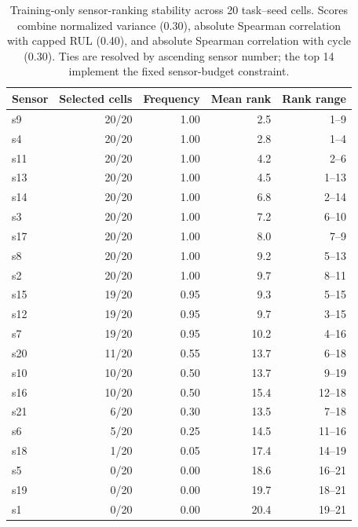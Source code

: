 \begin{table}[!t]
\centering
\scriptsize
\caption{Training-only sensor-ranking stability across 20 task--seed cells. Scores combine normalized variance (0.30), absolute Spearman correlation with capped RUL (0.40), and absolute Spearman correlation with cycle (0.30). Ties are resolved by ascending sensor number; the top 14 implement the fixed sensor-budget constraint.}
\label{tab:feature-selection-stability}
\begin{tabular}{lrrrr}
\toprule
Sensor & Selected cells & Frequency & Mean rank & Rank range \\
\midrule
s9 & 20/20 & 1.00 & 2.5 & 1--9 \\
s4 & 20/20 & 1.00 & 2.8 & 1--4 \\
s11 & 20/20 & 1.00 & 4.2 & 2--6 \\
s13 & 20/20 & 1.00 & 4.5 & 1--13 \\
s14 & 20/20 & 1.00 & 6.8 & 2--14 \\
s3 & 20/20 & 1.00 & 7.2 & 6--10 \\
s17 & 20/20 & 1.00 & 8.0 & 7--9 \\
s8 & 20/20 & 1.00 & 9.2 & 5--13 \\
s2 & 20/20 & 1.00 & 9.7 & 8--11 \\
s15 & 19/20 & 0.95 & 9.3 & 5--15 \\
s12 & 19/20 & 0.95 & 9.7 & 3--15 \\
s7 & 19/20 & 0.95 & 10.2 & 4--16 \\
s20 & 11/20 & 0.55 & 13.7 & 6--18 \\
s10 & 10/20 & 0.50 & 13.7 & 9--19 \\
s16 & 10/20 & 0.50 & 15.4 & 12--18 \\
s21 & 6/20 & 0.30 & 13.5 & 7--18 \\
s6 & 5/20 & 0.25 & 14.5 & 11--16 \\
s18 & 1/20 & 0.05 & 17.4 & 14--19 \\
s5 & 0/20 & 0.00 & 18.6 & 16--21 \\
s19 & 0/20 & 0.00 & 19.7 & 18--21 \\
s1 & 0/20 & 0.00 & 20.4 & 19--21 \\
\bottomrule
\end{tabular}
\end{table}
